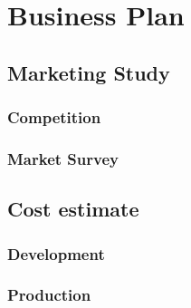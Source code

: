 \documentclass[ppfs.tex]{template/subfiles}
\begin{document}
\section{Business Plan}
    \subsection{Marketing Study}
        \subsubsection{Competition}
        \subsubsection{Market Survey}
    \subsection{Cost estimate}
        \subsubsection{Development}
        \subsubsection{Production}
\end{document}
